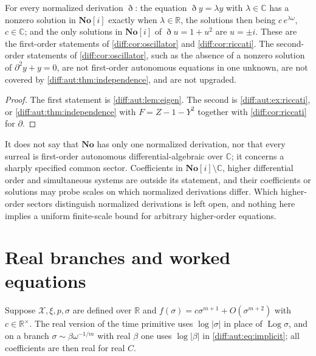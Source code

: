 \documentclass[11pt,letterpaper]{article}
\numberwithin{equation}{section}
\theoremstyle{definition}
\theoremstyle{remark}
\newcommand{\No}{\mathbf{No}}
\newcommand{\SC}{\mathbf{No}[i]}
\newcommand{\R}{\mathbb R}
\newcommand{\C}{\mathbb C}
\newcommand{\der}{\partial}
\newcommand{\abs}[1]{\lvert#1\rvert}
\newcommand{\Dn}{\eth}
\newcommand{\Log}{\operatorname{Log}}
\begin{document}
\begin{corollary}
\label{diff:aut:cor:earlier}
For every normalized derivation $\Dn$: the equation $\Dn y=\lambda y$ with
$\lambda\in\C$ has a nonzero solution in $\SC$ exactly when $\lambda\in\R$, the
solutions then being $c\,e^{\lambda\omega}$, $c\in\C$; and the only solutions in
$\SC$ of $\Dn u=1+u^{2}$ are $u=\pm i$. These are the first-order statements of
\cref{diff:cor:oscillator} and \cref{diff:cor:riccati}. The second-order
statements of \cref{diff:cor:oscillator}, such as the absence of a nonzero
solution of $\der^{2}y+y=0$, are not first-order autonomous equations in one
unknown, are not covered by \cref{diff:aut:thm:independence}, and are not
upgraded.
\end{corollary}
\begin{proof}
The first statement is \cref{diff:aut:lem:eigen}. The second is
\cref{diff:aut:ex:riccati}, or \cref{diff:aut:thm:independence} with
$F=Z-1-Y^{2}$ together with \cref{diff:cor:riccati} for $\der$.
\end{proof}

\begin{remark}
\label{diff:aut:rem:notsay}
It does not say that $\No$ has only one normalized derivation, nor that every
surreal is first-order autonomous differential-algebraic over $\C$; it concerns a
sharply specified common sector. Coefficients in $\SC\setminus\C$, higher
differential order and simultaneous systems are outside its statement, and
their coefficients or solutions may probe scales on which normalized
derivations differ. Which higher-order sectors distinguish normalized
derivations is left open, and nothing here implies a uniform finite-scale bound
for arbitrary higher-order equations.
\end{remark}

\section{Real branches and worked equations}
\label{diff:aut:sec:examples}

Suppose $\mathcal X,\xi,p,\sigma$ are defined over $\R$ and
$f(\sigma)=c\sigma^{m+1}+O(\sigma^{m+2})$ with $c\in\R^{\times}$. The real version
of the time primitive uses $\log\abs\sigma$ in place of $\Log\sigma$, and on a
branch $\sigma\sim\beta\omega^{-1/m}$ with real $\beta$ one uses $\log\abs\beta$ in
\cref{diff:aut:eq:implicit}; all coefficients are then real for real $C$.
\end{document}
